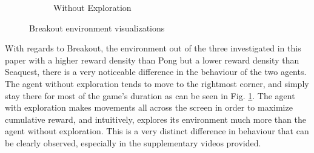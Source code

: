 \documentclass{article}
\begin{document}
\begin{figure}
\begin{subfigure}{.5\textwidth}
  \caption{Without Exploration}
\end{subfigure}
\caption{Breakout environment visualizations}
\label{fig:breakout}
\end{figure}
With regards to Breakout, the environment out of the three investigated in this paper with a higher reward density than Pong but a lower reward density than Seaquest, there is a very noticeable difference in the behaviour of the two agents. The agent without exploration tends to move to the rightmost corner, and simply stay there for most of the game’s duration as can be seen in Fig. \ref{fig:breakout}. The agent with exploration makes movements all across the screen in order to maximize cumulative reward, and intuitively, explores its environment much more than the agent without exploration. This is a very distinct difference in behaviour that can be clearly observed, especially in the supplementary videos provided.
\end{document}
